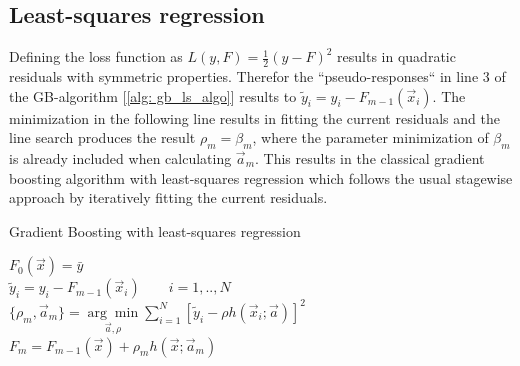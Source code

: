 \documentclass[12pt, a4paper]{article}
\begin{document}
\subsection{Least-squares regression}
Defining the loss function as $L(y,F) = \frac{1}{2} (y - F)^2$ results in quadratic residuals with symmetric properties. Therefor the ``pseudo-responses`` in line 3 of the GB-algorithm [\ref{alg: gb_ls_algo}] results to $\tilde{y}_i = y_i - F_{m-1}(\vec{x}_i)$. The minimization in the following line results in fitting the current residuals and the line search produces the result $\rho_m = \beta_m$, where the parameter minimization of $\beta_m$ is already included when calculating $\vec{a}_m$. This results in the classical gradient boosting algorithm with least-squares regression which follows the usual stagewise approach by iteratively fitting the current residuals.
\begin{algorithm}
\caption{Gradient Boosting with least-squares regression}
\label{alg: gb_ls_algo}
    $F_0(\vec{x}) = \bar{y}$ \\
    {
    $\tilde{y}_i = y_i - F_{m-1}(\vec{x}_i) \qquad i = 1,..,N$
    $\{\rho_m, \vec{a}_m \} = \underset{ \vec{a}, \rho }{\arg\min} 
    \sum_{i=1}^N [\tilde{y}_i - \rho h(\vec{x}_i;\vec{a})]^2$
    $F_{m} = F_{m-1}(\vec{x}) + \rho_m h(\vec{x};\vec{a}_m)$
    }
\end{algorithm}

\newpage
\end{document}
